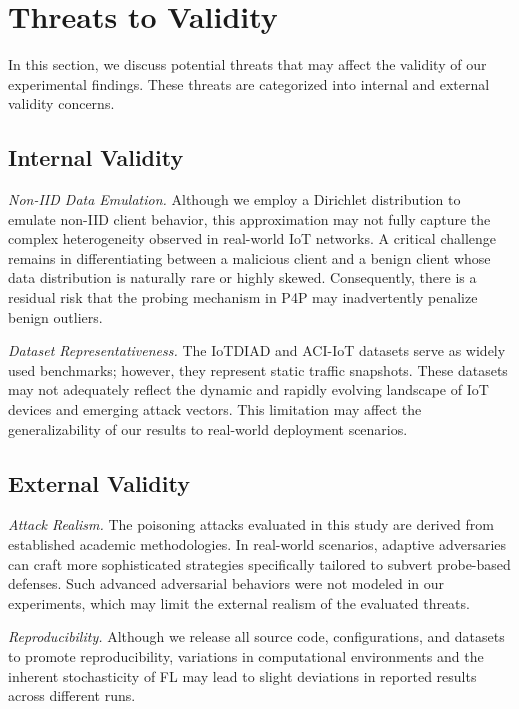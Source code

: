 \section{Threats to Validity}
\label{sect_threats_tovalidity}

In this section, we discuss potential threats that may affect the validity of our experimental findings. These threats are categorized into internal and external validity concerns.

\subsection{Internal Validity}

\textit{Non-IID Data Emulation.}
Although we employ a Dirichlet distribution to emulate non-IID client behavior, this approximation may not fully capture the complex heterogeneity observed in real-world IoT networks. A critical challenge remains in differentiating between a malicious client and a benign client whose data distribution is naturally rare or highly skewed. Consequently, there is a residual risk that the probing mechanism in P4P may inadvertently penalize benign outliers.

\textit{Dataset Representativeness.}
The IoTDIAD and ACI-IoT datasets serve as widely used benchmarks; however, they represent static traffic snapshots. These datasets may not adequately reflect the dynamic and rapidly evolving landscape of IoT devices and emerging attack vectors. This limitation may affect the generalizability of our results to real-world deployment scenarios.

\subsection{External Validity}

\textit{Attack Realism.}
The poisoning attacks evaluated in this study are derived from established academic methodologies. In real-world scenarios, adaptive adversaries can craft more sophisticated strategies specifically tailored to subvert probe-based defenses. Such advanced adversarial behaviors were not modeled in our experiments, which may limit the external realism of the evaluated threats.

\textit{Reproducibility.}
Although we release all source code, configurations, and datasets to promote reproducibility, variations in computational environments and the inherent stochasticity of FL may lead to slight deviations in reported results across different runs.

